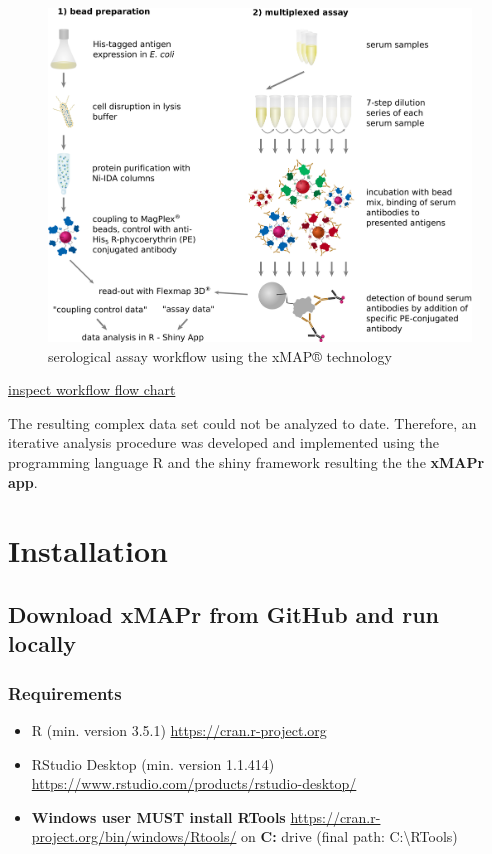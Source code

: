 \documentclass[
]{book}
\providecommand{\tightlist}{%
  \setlength{\itemsep}{0pt}\setlength{\parskip}{0pt}}
\begin{document}
\begin{figure}
\includegraphics[width=84.01in]{figures/serological_assay_workflow} \caption{serological assay workflow using the xMAP® technology}\label{fig:workflow}
\end{figure}

\href{figures/serological_assay_workflow.png}{inspect workflow flow chart}

The resulting complex data set could not be analyzed to date. Therefore, an iterative analysis procedure was developed and implemented using the programming language R and the shiny framework resulting the the \textbf{xMAPr app}.

\hypertarget{installation}{%
\chapter{Installation}\label{installation}}

\hypertarget{download-xmapr-from-github-and-run-locally}{%
\section{Download xMAPr from GitHub and run locally}\label{download-xmapr-from-github-and-run-locally}}

\hypertarget{requirements}{%
\subsection{Requirements}\label{requirements}}

\begin{itemize}
\tightlist
\item
  R (min. version 3.5.1) \url{https://cran.r-project.org}
\item
  RStudio Desktop (min. version 1.1.414) \url{https://www.rstudio.com/products/rstudio-desktop/}
\item
  \textbf{Windows user MUST install RTools} \url{https://cran.r-project.org/bin/windows/Rtools/} on \textbf{C:} drive (final path: C:\textbackslash RTools)
\end{itemize}
\end{document}
